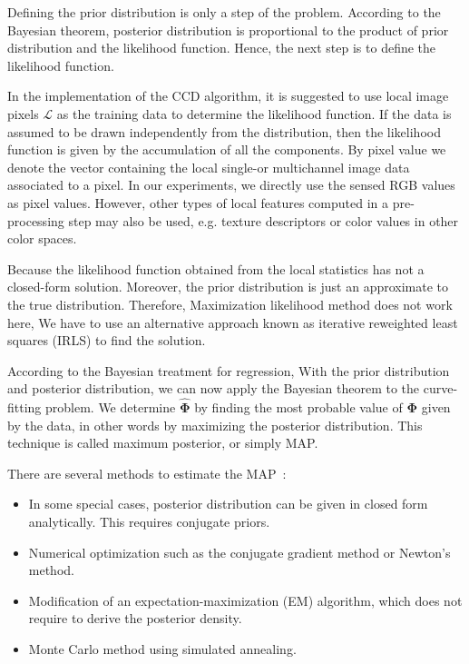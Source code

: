 Defining the prior distribution is only a step of the problem.
According to the Bayesian theorem, posterior distribution
is proportional to the product of prior distribution and the likelihood
function. Hence, the next step is to define the likelihood function.

In the implementation of the CCD algorithm, it is suggested to use
local image pixels $\mathcal{L}$ as the training data to determine the
likelihood function. If the data is assumed to be drawn  independently
from the distribution, then the likelihood function is given by the accumulation of all the components.
By pixel value we denote the vector containing the local single-or multichannel
image data associated to a pixel. In our experiments, we directly use the sensed RGB
values as pixel values. However, other types of local features computed in a pre-processing
step may also be used, e.g. texture descriptors or color values in
other color spaces.

Because the likelihood function obtained from the local statistics has
not a closed-form solution. Moreover, the prior distribution is just
an approximate to the true distribution. Therefore, Maximization
likelihood method does not work here, We have to use an alternative
approach known as iterative reweighted least squares (IRLS) to find the solution. 

 According to the Bayesian treatment for regression, 
With the prior distribution and posterior distribution, we can now
apply the Bayesian theorem to the curve-fitting problem.
We determine $\hat{\mathbf{\Phi}}$ by finding the most probable
value of $\mathbf{\Phi}$ given by the data, in other words by maximizing
the posterior distribution. This technique is called maximum
posterior, or simply MAP.

There are several methods to estimate the MAP~\cite{map}:
\begin{itemize}
\item In some special cases, posterior distribution can be given in
  closed form analytically. This requires conjugate priors.
\item Numerical optimization such as the conjugate gradient method or
  Newton's method.
\item Modification of an expectation-maximization (EM) algorithm,
  which does not require to derive the posterior density.
\item Monte Carlo method using simulated annealing.
\end{itemize}

